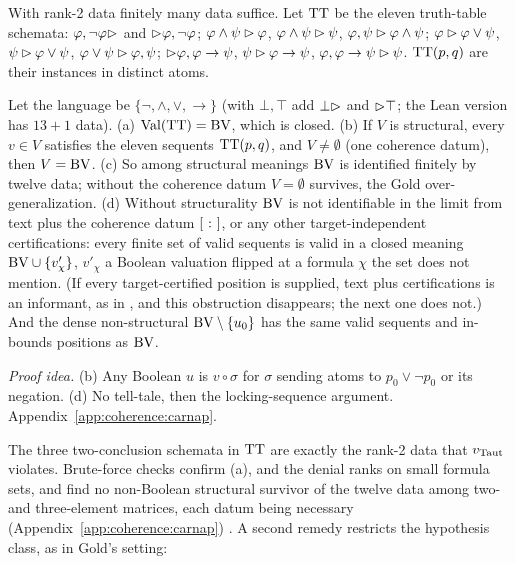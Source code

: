 With rank-2 data finitely many data suffice. Let $\mathrm{TT}$ be the eleven truth-table schemata: $\varphi,\neg\varphi\rhd$ and $\rhd\varphi,\neg\varphi$; $\varphi\wedge\psi\rhd\varphi$, $\varphi\wedge\psi\rhd\psi$, $\varphi,\psi\rhd\varphi\wedge\psi$; $\varphi\rhd\varphi\vee\psi$, $\psi\rhd\varphi\vee\psi$, $\varphi\vee\psi\rhd\varphi,\psi$; $\rhd\varphi,\varphi\to\psi$, $\psi\rhd\varphi\to\psi$, $\varphi,\varphi\to\psi\rhd\psi$. $\mathrm{TT}(p,q)$ are their instances in distinct atoms.

\begin{theorem}\label{thm:coherence:telltale}
Let the language be $\{\neg,\wedge,\vee,\to\}$ (with $\bot,\top$ add $\bot\rhd$ and $\rhd\top$; the Lean version has $13+1$ data).
\textup{(a)} $\mathrm{Val}(\mathrm{TT})=\mathrm{BV}$, which is closed.
\textup{(b)} If $V$ is structural, every $v\in V$ satisfies the eleven sequents $\mathrm{TT}(p,q)$, and $V\neq\emptyset$ (one coherence datum), then $V=\mathrm{BV}$.
\textup{(c)} So among structural meanings $\mathrm{BV}$ is identified finitely by twelve data; without the coherence datum $V=\emptyset$ survives, the Gold over-generalization.
\textup{(d)} Without structurality $\mathrm{BV}$ is not identifiable in the limit from text plus the coherence datum $[\  : \ ]$, or any other target-independent certifications: every finite set of valid sequents is valid in a closed meaning $\mathrm{BV}\cup\{v'_\chi\}$, $v'_\chi$ a Boolean valuation flipped at a formula $\chi$ the set does not mention. (If every target-certified position is supplied, text plus certifications is an informant, as in , and this obstruction disappears; the next one does not.) And the dense non-structural $\mathrm{BV}\setminus\{u_0\}$ has the same valid sequents and in-bounds positions as $\mathrm{BV}$. \hfill{}\ 
\end{theorem}

\noindent\emph{Proof idea.} (b) Any Boolean $u$ is $v\circ\sigma$ for $\sigma$ sending atoms to $p_0\vee\neg p_0$ or its negation. (d) No tell-tale, then the locking-sequence argument. Appendix~\ref{app:coherence:carnap}.

The three two-conclusion schemata in $\mathrm{TT}$ are exactly the rank-2 data that $v_{\mathrm{Taut}}$ violates. Brute-force checks confirm (a),  and the denial ranks on small formula sets, and find no non-Boolean structural survivor of the twelve data among two- and three-element matrices, each datum being necessary (Appendix~\ref{app:coherence:carnap}) . A second remedy restricts the hypothesis class, as in Gold's setting:

